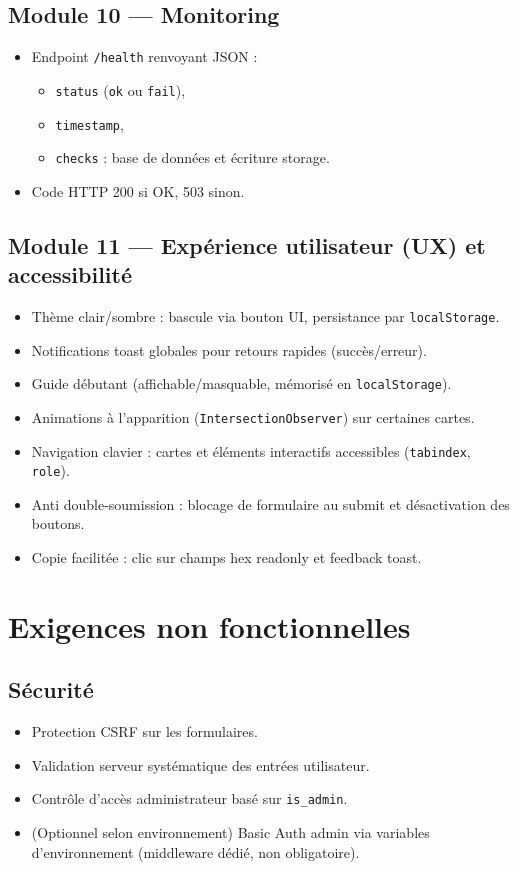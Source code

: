 \documentclass[12pt,a4paper]{article}
\begin{document}
\subsection{Module 10 --- Monitoring}
\begin{itemize}[leftmargin=*]
  \item Endpoint \texttt{/health} renvoyant JSON :
    \begin{itemize}[leftmargin=*]
      \item \texttt{status} (\texttt{ok} ou \texttt{fail}),
      \item \texttt{timestamp},
      \item \texttt{checks} : base de données et écriture storage.
    \end{itemize}
  \item Code HTTP 200 si OK, 503 sinon.
\end{itemize}

\subsection{Module 11 --- Expérience utilisateur (UX) et accessibilité}
\begin{itemize}[leftmargin=*]
  \item Thème clair/sombre : bascule via bouton UI, persistance par \texttt{localStorage}.
  \item Notifications toast globales pour retours rapides (succès/erreur).
  \item Guide débutant (affichable/masquable, mémorisé en \texttt{localStorage}).
  \item Animations à l'apparition (\texttt{IntersectionObserver}) sur certaines cartes.
  \item Navigation clavier : cartes et éléments interactifs accessibles (\texttt{tabindex}, \texttt{role}).
  \item Anti double-soumission : blocage de formulaire au submit et désactivation des boutons.
  \item Copie facilitée : clic sur champs hex readonly et feedback toast.
\end{itemize}

\section{Exigences non fonctionnelles}
\subsection{Sécurité}
\begin{itemize}[leftmargin=*]
  \item Protection CSRF sur les formulaires.
  \item Validation serveur systématique des entrées utilisateur.
  \item Contrôle d'accès administrateur basé sur \texttt{is\_admin}.
  \item (Optionnel selon environnement) Basic Auth admin via variables d'environnement (middleware dédié, non obligatoire).
\end{itemize}
\end{document}
